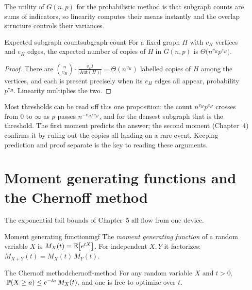 The utility of $G(n,p)$ for the probabilistic method is that subgraph counts are
sums of indicators, so linearity computes their means instantly and the overlap
structure controls their variances.

\begin{proposition}{Expected subgraph count}{subgraph-count}
For a fixed graph $H$ with $v_H$ vertices and $e_H$ edges, the expected number
of copies of $H$ in $G(n,p)$ is $\Theta\bigl(n^{v_H}p^{e_H}\bigr)$.
\end{proposition}

\begin{proof}
There are $\binom{n}{v_H}\cdot\tfrac{v_H!}{|\mathrm{Aut}(H)|}=\Theta(n^{v_H})$
labelled copies of $H$ among the vertices, and each is present precisely when its
$e_H$ edges all appear, probability $p^{e_H}$. Linearity multiplies the two.
\end{proof}

\begin{insight}
Most thresholds can be read off this one proposition: the count $n^{v_H}p^{e_H}$
crosses from $0$ to $\infty$ as $p$ passes $n^{-v_H/e_H}$, and for the densest
subgraph that is the threshold. The first moment predicts the answer; the second
moment (Chapter~4) confirms it by ruling out the copies all landing on a rare
event. Keeping prediction and proof separate is the key to reading these
arguments.
\end{insight}

\section{Moment generating functions and the Chernoff method}

The exponential tail bounds of Chapter~5 all flow from one device.

\begin{definition}{Moment generating function}{mgf}
The \emph{moment generating function} of a random variable $X$ is
$M_X(t)=\mathbb{E}\bigl[e^{tX}\bigr]$. For independent $X,Y$ it factorizes:
$M_{X+Y}(t)=M_X(t)\,M_Y(t)$.
\end{definition}

\begin{proposition}{The Chernoff method}{chernoff-method}
For any random variable $X$ and $t>0$,
$\;\mathbb{P}(X\ge a)\le e^{-ta}\,M_X(t)$, and one is free to optimize over $t$.
\end{proposition}

